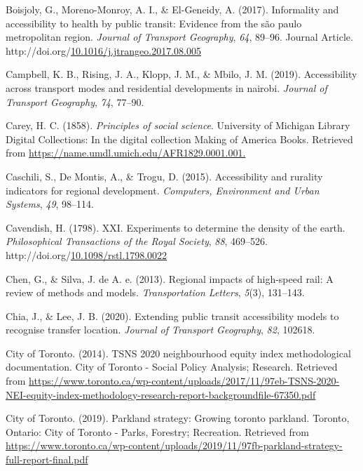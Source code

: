 \documentclass[
11pt, %
oneside, %
english, %
singlespacing, %
]{macthesis} %
\newlength{\cslhangindent}
\newenvironment{CSLReferences}[2] %
{\begin{list}{}{%
	\setlength{\itemindent}{0pt}
	\setlength{\leftmargin}{0pt}
	\setlength{\parsep}{0pt}
	\ifodd #1
	\setlength{\leftmargin}{\cslhangindent}
	\setlength{\itemindent}{-1\cslhangindent}
	\fi
	\setlength{\itemsep}{#2\baselineskip}}}
{\end{list}}
\begin{document}
\begin{CSLReferences}{1}{0}
Boisjoly, G., Moreno-Monroy, A. I., \& El-Geneidy, A. (2017). Informality and accessibility to health by public transit: Evidence from the são paulo metropolitan region. \emph{Journal of Transport Geography}, \emph{64}, 89--96. Journal Article. http://doi.org/\href{https://doi.org/10.1016/j.jtrangeo.2017.08.005}{10.1016/j.jtrangeo.2017.08.005}

Campbell, K. B., Rising, J. A., Klopp, J. M., \& Mbilo, J. M. (2019). Accessibility across transport modes and residential developments in nairobi. \emph{Journal of Transport Geography}, \emph{74}, 77--90.

Carey, H. C. (1858). \emph{Principles of social science}. University of Michigan Library Digital Collections: In the digital collection Making of America Books. Retrieved from \url{https://name.umdl.umich.edu/AFR1829.0001.001.}

Caschili, S., De Montis, A., \& Trogu, D. (2015). Accessibility and rurality indicators for regional development. \emph{Computers, Environment and Urban Systems}, \emph{49}, 98--114.

Cavendish, H. (1798). {XXI}. {Experiments} to determine the density of the earth. \emph{Philosophical Transactions of the Royal Society}, \emph{88}, 469--526. http://doi.org/\href{https://doi.org/10.1098/rstl.1798.0022}{10.1098/rstl.1798.0022}

Chen, G., \& Silva, J. de A. e. (2013). Regional impacts of high-speed rail: A review of methods and models. \emph{Transportation Letters}, \emph{5}(3), 131--143.

Chia, J., \& Lee, J. B. (2020). Extending public transit accessibility models to recognise transfer location. \emph{Journal of Transport Geography}, \emph{82}, 102618.

City of Toronto. (2014). TSNS 2020 neighbourhood equity index methodological documentation. City of Toronto - Social Policy Analysis; Research. Retrieved from \url{https://www.toronto.ca/wp-content/uploads/2017/11/97eb-TSNS-2020-NEI-equity-index-methodology-research-report-backgroundfile-67350.pdf}

City of Toronto. (2019). Parkland strategy: Growing toronto parkland. Toronto, Ontario: City of Toronto - Parks, Forestry; Recreation. Retrieved from \url{https://www.toronto.ca/wp-content/uploads/2019/11/97fb-parkland-strategy-full-report-final.pdf}


\end{CSLReferences}
\end{document}
